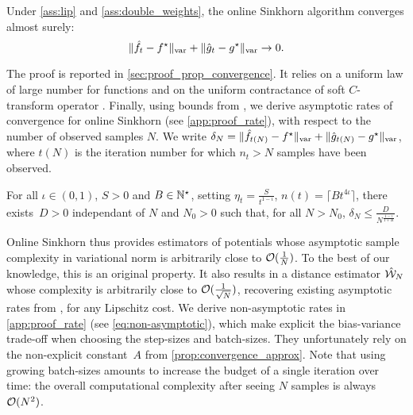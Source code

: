 \begin{proposition}\label{prop:convergence_true}
    Under \autoref{ass:lip} and
    \ref{ass:double_weights}, the online Sinkhorn algorithm converges almost surely:
    \begin{equation}
        \Vert \hat f_t - f^\star \Vert_{\text{\upshape var}} + \Vert \hat g_t - g^\star \Vert_{\text{\upshape var}} \to 0.
    \end{equation}
\end{proposition}

The proof is reported in \autoref{sec:proof_prop_convergence}. It relies on a uniform
law of large number for functions \citep[][chapter
19]{van_der_vaart_asymptotic_2000} and on the uniform contractance of soft
$C$-transform operator \citep[e.g.][Proposition 19]{vialard2019elementary}. Finally, using bounds from \cite{moulines_non-asymptotic_2011}, we derive  asymptotic rates of convergence for online Sinkhorn (see \autoref{app:proof_rate}), with
respect to the number of observed samples $N$. We write $\delta_N = \Vert \hat
f_{t(N)} - f^\star \Vert_{\text{\upshape var}} + \Vert \hat g_{t(N)} - g^\star \Vert_{\text{\upshape var}}$,
where $t(N)$ is the iteration number for which $n_t > N$ samples have been observed.

\begin{proposition}\label{prop:rate}
    For all $\iota \in (0, 1)$, $S > 0$ and $B \in \mathbb{N}^\star$, setting $\eta_t =
    \frac{S}{t^{1 - \iota}}$, $n(t) = \lceil B t^{4\iota} \rceil$, there
    exists~$D > 0$ independant of $N$ and $N_0 > 0$ such that, for all $N >
    N_0$, $\delta_N \leq \frac{D}{N^{\frac{1 - \iota}{1 + 4 \iota}}}$.
\end{proposition}

Online Sinkhorn thus provides estimators of potentials whose asymptotic sample
complexity in variational norm is arbitrarily close to $\mathcal{O}(\frac{1}{N})$. To
the best of our knowledge, this is an original property. It also results in a distance estimator $\hat {\mathcal{W}}_N$ whose
complexity is arbitrarily close to $\mathcal{O}(\frac{1}{\sqrt{N}})$, recovering
existing asymptotic rates from \cite{2019-Genevay-aistats}, for any Lipschitz cost. We derive non-asymptotic rates in \autoref{app:proof_rate} (see \eqref{eq:non-asymptotic}), which make explicit the
bias-variance trade-off when choosing the step-sizes and batch-sizes. They
unfortunately rely on the non-explicit constant~$A$ from
\autoref{prop:convergence_approx}. Note that using growing batch-sizes amounts
to increase the budget of a single iteration over time: the overall
computational complexity after seeing $N$ samples is always $\mathcal{O}(N^2)$.


